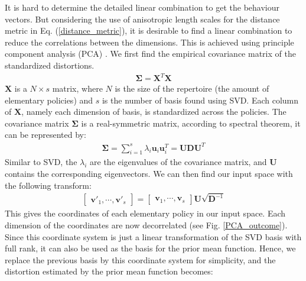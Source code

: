 \documentclass[journal]{IEEEtran}
\begin{document}
It is hard to determine the detailed linear combination to get the behaviour vectors.
But considering the use of anisotropic length scales for the distance metric in Eq. (\ref{distance_metric}), it is desirable to find a linear combination to reduce the correlations between the dimensions.
This is achieved using principle component analysis (PCA) \cite{PCA}. We first find the empirical covariance matrix of the standardized distortions.
\begin{equation}
\begin{gathered}
\bm{\Sigma} = \bm{X}^T \bm{X}
\end{gathered}
\label{cov}
\end{equation}
$\bm{X}$ is a $N \times s$ matrix, where $N$ is the size of the repertoire (the amount of elementary policies) and $s$ is the number of basis found using SVD.
Each column of $\bm{X}$, namely each dimension of basis, is standardized across the policies.
The covariance matrix $\bm{\Sigma}$ is a real-symmetric matrix, according to spectral theorem, it can be represented by:
\begin{equation}
\begin{gathered}
\bm{\Sigma} = 
\sum_{i=1}^s \lambda_i \bm{u}_i \bm{u}_i^T = \bm{U} \bm{D} \bm{U}^T
\end{gathered}
\label{PCA}
\end{equation}
Similar to SVD, the $\lambda_i$ are the eigenvalues of the covariance matrix, and $\bm{U}$ contains the corresponding eigenvectors.
We can then find our input space with the following transform:
\begin{equation}
\begin{gathered}
\begin{bmatrix}
\bm{v}'_1, \cdots, \bm{v}'_s
\end{bmatrix}
=
\begin{bmatrix}
\bm{v}_1, \cdots, \bm{v}_s
\end{bmatrix}
\bm{U} \sqrt{\bm{D}^{-1}}
\end{gathered}
\label{input_space}
\end{equation}
This gives the coordinates of each elementary policy in our input space. Each dimension of the coordinates are now decorrelated (see Fig. \ref{PCA_outcome}).
Since this coordinate system is just a linear transformation of the SVD basis with full rank, it can also be used as the basis for the prior mean function.
Hence, we replace the previous basis by this coordinate system for simplicity, and the distortion estimated by the prior mean function becomes: 
\end{document}
